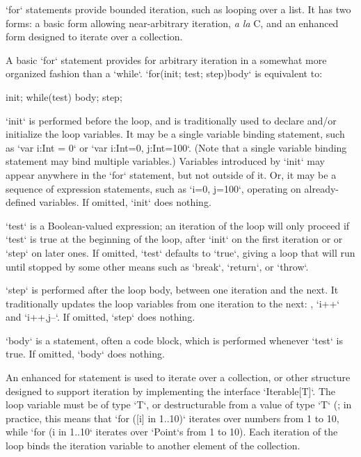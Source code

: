 \xcd`for` statements provide bounded iteration, such as looping over a list.
It has two forms: a basic form allowing near-arbitrary iteration, {\em a la}
C, and an enhanced form designed to iterate over a collection.

A basic \xcd`for` statement provides for arbitrary iteration in a somewhat
more organized fashion than a \xcd`while`.  \xcd`for(init; test; step)body` is
equivalent to: 
\begin{xten}
{
   init;
   while(test) {
      body;
      step;
   }
}
\end{xten}

\xcd`init` is performed before the loop, and is traditionally used to declare
and/or initialize the loop variables. It may be a single variable binding
statement, such as \xcd`var i:Int = 0` or \xcd`var i:Int=0, j:Int=100`. (Note
that a single variable binding statement may bind multiple variables.)
Variables introduced by \xcd`init` may appear anywhere in the \xcd`for`
statement, but not outside of it.  Or, it may be a sequence of expression
statements, such as \xcd`i=0, j=100`, operating on already-defined variables.
If omitted, \xcd`init` does nothing.

\xcd`test` is a Boolean-valued expression; an iteration of the loop will only
proceed if \xcd`test` is true at the beginning of the loop, after \xcd`init`
on the first iteration or or \xcd`step` on later ones. If omitted, \xcd`test`
defaults to \xcd`true`, giving a loop that will run until stopped by some
other means such as \xcd`break`, \xcd`return`, or \xcd`throw`.

\xcd`step` is performed after the loop body, between one iteration and the
next. It traditionally updates the loop variables from one iteration to the
next: \eg, \xcd`i++` and \xcd`i++,j--`.  If omitted, \xcd`step` does nothing.

\xcd`body` is a statement, often a code block, which is performed whenever
\xcd`test` is true.  If omitted, \xcd`body` does nothing.




\label{ForAllLoop}


An enhanced for statement is used to iterate over a collection, or other
structure designed to support iteration by implementing the interface
\xcd`Iterable[T]`.    The loop variable must be of type \xcd`T`, 
or destructurable from a value of type \xcd`T`
(; in practice, this means that 
\xcd`for ([i] in 1..10)` iterates over numbers from 1 to 10, while 
\xcd`for (i in 1..10` iterates over \xcd`Point`s from 1 to 10).
Each iteration of the loop
binds the iteration variable to another element of the collection.

